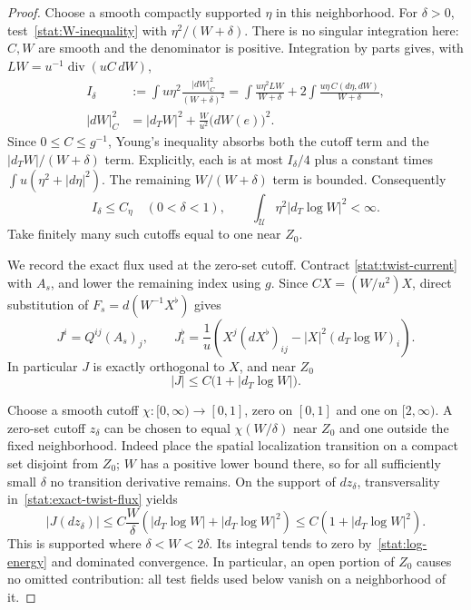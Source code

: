 \begin{proof}
Choose a smooth compactly supported $\eta$ in this neighborhood.
For $\delta>0$, test~\eqref{stat:W-inequality} with
$\eta^2/(W+\delta)$.  There is no singular integration here: $C,W$
are smooth and the denominator is positive.  Integration by parts
gives, with $L W=u^{-1}\operatorname{div}(uC\,dW)$,
\begin{align*}
 I_\delta
 &:=\int u\eta^2\frac{|dW|_C^2}{(W+\delta)^2}
  =\int\frac{u\eta^2LW}{W+\delta}
     +2\int\frac{u\eta\,C(d\eta,dW)}{W+\delta},\\
 |dW|_C^2&=|d_TW|^2+\frac W{u^2}\bigl(dW(e)\bigr)^2.
\end{align*}
Since $0\leq C\leq g^{-1}$, Young's inequality absorbs both the
cutoff term and the $|d_TW|/(W+\delta)$ term.  Explicitly, each is
at most $I_\delta/4$ plus a constant times
$\int u(\eta^2+|d\eta|^2)$.  The remaining
$W/(W+\delta)$ term is bounded.  Consequently
\begin{equation}
 I_\delta\leq C_\eta\quad(0<\delta<1),\qquad
 \int_{\mathcal U}\eta^2|d_T\log W|^2<\infty.
 \label{stat:log-energy}
\end{equation}
Take finitely many such cutoffs equal to one near $Z_0$.

We record the exact flux used at the zero-set cutoff.  Contract
\eqref{stat:twist-current} with $A_s$, and lower the remaining index
using $g$.  Since $C X=(W/u^2)X$, direct substitution of
$F_s=d(W^{-1}X^\flat)$ gives
\begin{equation}
 J^i=Q^{ij}(A_s)_j,\qquad
 J^\flat_i=\frac1u\left(
        X^j(dX^\flat)_{ij}-|X|^2(d_T\log W)_i\right).
 \label{stat:exact-twist-flux}
\end{equation}
In particular $J$ is exactly orthogonal to $X$, and near $Z_0$
\begin{equation}
 |J|\leq C\bigl(1+|d_T\log W|\bigr).
 \label{stat:twist-flux-bound}
\end{equation}

Choose a smooth cutoff $\chi:[0,\infty)\to[0,1]$, zero on $[0,1]$
and one on $[2,\infty)$.  A zero-set cutoff $z_\delta$ can be chosen
to equal $\chi(W/\delta)$ near $Z_0$ and one outside the fixed
neighborhood.  Indeed place the spatial localization transition on
a compact set disjoint from $Z_0$; $W$ has a positive lower bound
there, so for all sufficiently small $\delta$ no transition
derivative remains.  On the support of $dz_\delta$, transversality
in~\eqref{stat:exact-twist-flux} yields
\begin{equation}
 |J(dz_\delta)|
 \leq C\frac W\delta
       \left(|d_T\log W|+|d_T\log W|^2\right)
 \leq C\left(1+|d_T\log W|^2\right).
 \label{stat:zero-cutoff-error}
\end{equation}
This is supported where $\delta<W<2\delta$.  Its integral tends to
zero by~\eqref{stat:log-energy} and dominated convergence.  In
particular, an open portion of $Z_0$ causes no omitted contribution:
all test fields used below vanish on a neighborhood of it.


\end{proof}
